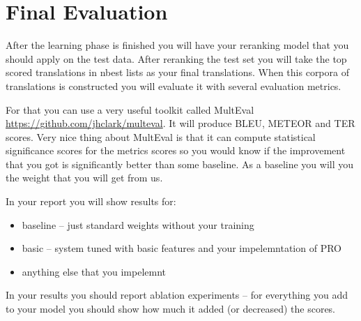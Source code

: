 \section{Final Evaluation}

After the learning phase is finished you will have your reranking model that you should apply on the test data. After reranking the test set you will take the top scored translations in nbest lists as your final translations. When this corpora of translations is constructed you will evaluate it with several evaluation metrics.

For that you can use a very useful toolkit called MultEval \url{https://github.com/jhclark/multeval}. It will produce BLEU, METEOR and TER scores. Very nice thing about MultEval is that it can compute statistical significance scores for the metrics scores so you would know if the improvement that you got is significantly better than some baseline. As a baseline you will you the weight that you will get from us. 

In your report you will show results for:
\begin{itemize}
\item baseline -- just standard weights without your training
\item basic -- system tuned with basic features and your impelemntation of PRO
\item anything else that you impelemnt
\end{itemize}

In your results you should report ablation experiments -- for everything you add to your model you should show how much it added (or decreased) the scores.
